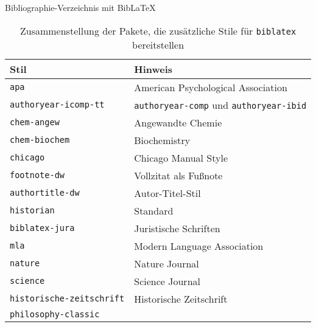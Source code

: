 \begin{frame}[fragile]{Bibliographie-Verzeichnis mit Bib\LaTeX}
\begin{table}
	\caption{Zusammenstellung der Pakete, die zusätzliche Stile für \texttt{biblatex} bereitstellen}
	\begin{tabular}{ll}
		\hline
		Stil & Hinweis \\
		\hline
		\texttt{apa} & American Psychological Association \\
		\texttt{authoryear-icomp-tt} & \texttt{authoryear-comp} und \texttt{authoryear-ibid} \\
		\texttt{chem-angew} & Angewandte Chemie \\
		\texttt{chem-biochem} & Biochemistry \\
		\texttt{chicago} & Chicago Manual Style \\
		\texttt{footnote-dw} & Vollzitat als Fußnote \\
		\texttt{authortitle-dw} & Autor-Titel-Stil \\
		\texttt{historian} & Standard \\
		\texttt{biblatex-jura} & Juristische Schriften \\
		\texttt{mla} & Modern Language Association \\
		\texttt{nature} & Nature Journal \\
		\texttt{science} & Science Journal \\
		\texttt{historische-zeitschrift} & Historische Zeitschrift \\
		\texttt{philosophy-classic} & \\
		\hline
	\end{tabular}
\end{table}

\end{frame}


